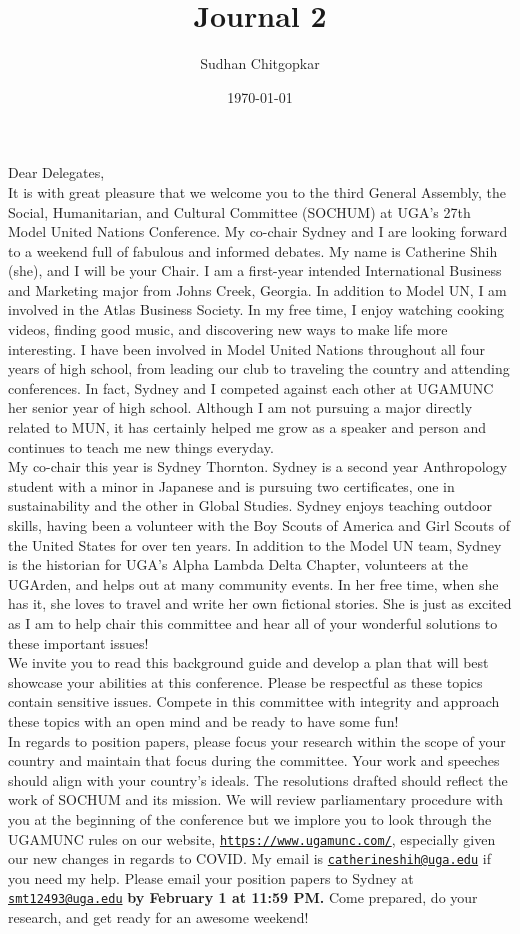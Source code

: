 \documentclass[10pt, letterpaper]{article}
\title{Journal 2}
\author{Sudhan Chitgopkar}
\date{\today}
\begin{document}
Dear Delegates,\\

It is with great pleasure that we welcome you to the third General
Assembly, the Social, Humanitarian, and Cultural Committee (SOCHUM) at
UGA's 27th Model United Nations Conference. My co-chair Sydney and I are
looking forward to a weekend full of fabulous and informed debates. My
name is Catherine Shih (she), and I will be your Chair. I am a
first-year intended International Business and Marketing major from
Johns Creek, Georgia. In addition to Model UN, I am involved in the
Atlas Business Society. In my free time, I enjoy watching cooking
videos, finding good music, and discovering new ways to make life more
interesting. I have been involved in Model United Nations throughout all
four years of high school, from leading our club to traveling the
country and attending conferences. In fact, Sydney and I competed
against each other at UGAMUNC her senior year of high school. Although I
am not pursuing a major directly related to MUN, it has certainly helped
me grow as a speaker and person and continues to teach me new things
everyday. \\

My co-chair this year is Sydney Thornton. Sydney is a second year
Anthropology student with a minor in Japanese and is pursuing two
certificates, one in sustainability and the other in Global Studies.
Sydney enjoys teaching outdoor skills, having been a volunteer with the
Boy Scouts of America and Girl Scouts of the United States for over ten
years. In addition to the Model UN team, Sydney is the historian for
UGA's Alpha Lambda Delta Chapter, volunteers at the UGArden, and helps
out at many community events. In her free time, when she has it, she
loves to travel and write her own fictional stories. She is just as
excited as I am to help chair this committee and hear all of your
wonderful solutions to these important issues! \\

We invite you to read this background guide and develop a plan that will
best showcase your abilities at this conference. Please be respectful as
these topics contain sensitive issues. Compete in this committee with
integrity and approach these topics with an open mind and be ready to
have some fun! \\

In regards to position papers, please focus your research within the
scope of your country and maintain that focus during the committee. Your
work and speeches should align with your country's ideals. The
resolutions drafted should reflect the work of SOCHUM and its mission.
We will review parliamentary procedure with you at the beginning of the
conference but we implore you to look through the UGAMUNC rules on our
website, 
\texttt{\href{https://www.ugamunc.com/}{{https://www.ugamunc.com/}}},
especially given our new changes in regards to COVID. My email is
\texttt{\href{mailto:catherineshih@uga.edu}{{catherineshih@uga.edu}}}
if you need my help. Please email your position papers to Sydney at
\texttt{\href{mailto:smt12493@uga.edu}{{smt12493@uga.edu}}} \textbf{by February
1 at 11:59 PM.} Come prepared, do your research, and get ready for an
awesome weekend! \\
\end{document}
